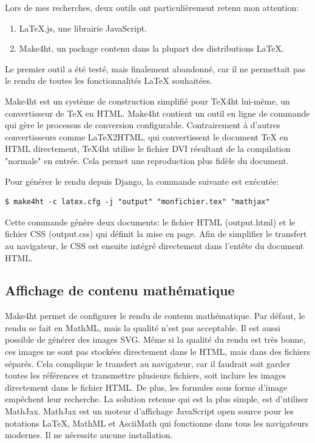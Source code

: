 \documentclass[12pt,titlepage,oneside]{article}
\renewcommand{\footnote}[1]{}
\begin{document}
Lors de mes recherches, deux outils ont particulièrement retenu mon attention:
\begin{enumerate}
\item LaTeX.js\footnote{\url{https://latex.js.org/}}, une librairie JavaScript.
\item Make4ht\footnote{\url{https://ctan.org/pkg/make4ht?lang=en}}, un package contenu dans la plupart des distributions LaTeX.
\end{enumerate}
Le premier outil a été testé, mais finalement abandonné\footnote{voir \nameref{AlternativesConsidérées}}, car il ne permettait pas le rendu de toutes les fonctionnalités LaTeX souhaitées.\par
Make4ht est un système de construction simplifié pour TeX4ht\footnote{voir \url{https://tug.org/tex4ht/}} lui-même, un convertisseur de TeX en HTML. Make4ht contient un outil en ligne de commande qui gère le processus de conversion configurable. Contrairement à d'autres convertisseurs comme LaTeX2HTML, qui convertissent le document TeX en HTML directement, TeX4ht utilise le fichier DVI\footnote{DeVice-Independent} résultant de la compilation "normale" en entrée. Cela permet une reproduction plus fidèle du document.\par

Pour générer le rendu depuis Django, la commande suivante est exécutée:
\begin{lstlisting}[style=MyHTML, caption = Ligne de commande pour le rendu]
$ make4ht -c latex.cfg -j "output" "monfichier.tex" "mathjax"
\end{lstlisting}
\vspace{-0.5cm}
Cette commande génère deux documents: le fichier HTML (output.html) et le fichier CSS (output.css) qui définit la mise en page. Afin de simplifier le transfert au navigateur, le CSS est ensuite intégré directement dans l'entête du document HTML.

\newpage

\subsection{Affichage de contenu mathématique}
Make4ht permet de configurer le rendu de contenu mathématique. Par défaut, le rendu se fait en MathML, mais la qualité n'est pas acceptable. Il est aussi possible de générer des images SVG. Même si la qualité du rendu est très bonne, ces images ne sont pas stockées directement dans le HTML, mais dans des fichiers séparés. Cela complique le transfert au navigateur, car il faudrait soit garder toutes les références et transmettre plusieurs fichiers, soit inclure les images directement dans le fichier HTML. De plus, les formules sous forme d'image empêchent leur recherche. La solution retenue qui est la plus simple, est d'utiliser MathJax\footnote{\url{https://docs.mathjax.org/en/latest/index.html}}. MathJax est un moteur d'affichage JavaScript open source pour les notations LaTeX, MathML et AsciiMath qui fonctionne dans tous les navigateurs modernes. Il ne nécessite aucune installation.
\end{document}
